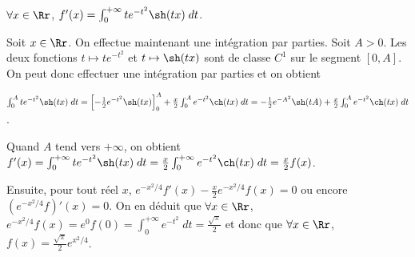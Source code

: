 {{\begin{center}
$\forall x\in\Rr$, $f'(x)=\int_{0}^{+\infty}te^{-t^2}\sh(tx)\;dt$.
\end{center}

Soit $x\in\Rr$. On effectue maintenant une intégration par parties. Soit $A>0$. Les deux fonctions $t\mapsto te^{-t^2}$ et $t\mapsto\sh(tx)$ sont de classe $C^1$ sur le segment $[0,A]$. On peut donc effectuer une intégration par parties et on obtient

\begin{center}
$\int_{0}^{A}te^{-t^2}\sh(tx)\;dt=\left[-\frac{1}{2}e^{-t^2}\sh(tx)\right]_0^A+\frac{x}{2}\int_{0}^{A}e^{-t^2}\ch(tx)\;dt=-\frac{1}{2}e^{-A^2}\sh(tA)+\frac{x}{2}\int_{0}^{A}e^{-t^2}\ch(tx)\;dt$.
\end{center}

Quand $A$ tend vers $+\infty$, on obtient $f'(x)=\int_{0}^{+\infty}te^{-t^2}\sh(tx)\;dt=\frac{x}{2}\int_{0}^{+\infty}e^{-t^2}\ch(tx)\;dt=\frac{x}{2}f(x)$.

Ensuite, pour tout réel $x$, $e^{-x^2/4}f'(x)-\frac{x}{2}e^{-x^2/4}f(x)=0$ ou encore $(e^{-x^2/4}f)'(x)=0$. On en déduit que $\forall x\in\Rr$, $e^{-x^2/4}f(x)=e^0f(0)=\int_{0}^{+\infty}e^{-t^2}\;dt=\frac{\sqrt{\pi}}{2}$ et donc que $\forall x\in\Rr$, $f(x)=\frac{\sqrt{\pi}}{2}e^{x^2/4}$.

\begin{center}
\end{center}
}
}
